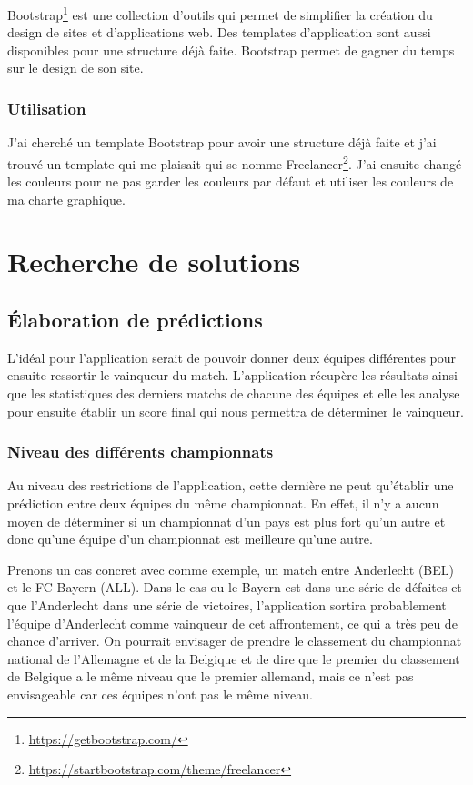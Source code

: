 \documentclass[a4paper,14pt]{extarticle}
\begin{document}
{Bootstrap\footnote{\url{https://getbootstrap.com/}} est une collection d'outils qui permet de simplifier la création du design de sites et d'applications web. Des templates d'application sont aussi disponibles pour une structure déjà faite. Bootstrap permet de gagner du temps sur le design de son site.

\subsubsection{Utilisation}

J'ai cherché un template Bootstrap pour avoir une structure déjà faite et j'ai trouvé un template qui me plaisait qui se nomme Freelancer\footnote{\url{https://startbootstrap.com/theme/freelancer}}. J'ai ensuite changé les couleurs pour ne pas garder les couleurs par défaut et utiliser les couleurs de ma charte graphique. 

\newpage

\section{Recherche de solutions}

\subsection{Élaboration de prédictions}

L'idéal pour l'application serait de pouvoir donner deux équipes différentes pour ensuite ressortir le vainqueur du match. L'application récupère les résultats ainsi que les statistiques des derniers matchs de chacune des équipes et elle les analyse pour ensuite établir un score final qui nous permettra de déterminer le vainqueur.


\subsubsection{Niveau des différents championnats}
\label{niveauDifferentChampionnats}
Au niveau des restrictions de l'application, cette dernière ne peut qu'établir une prédiction entre deux équipes du même championnat. En effet, il n'y a aucun moyen de déterminer si un championnat d'un pays est plus fort qu'un autre et donc qu'une équipe d'un championnat est meilleure qu'une autre. 

Prenons un cas concret avec comme exemple, un match entre Anderlecht (BEL) et le FC Bayern (ALL). Dans le cas ou le Bayern est dans une série de défaites et que l'Anderlecht dans une série de victoires, l'application sortira probablement l'équipe d'Anderlecht comme vainqueur de cet affrontement, ce qui a très peu de chance d'arriver. 
On pourrait envisager de prendre le classement du championnat national de l'Allemagne et de la Belgique et de dire que le premier du classement de Belgique a le même niveau que le premier allemand, mais ce n'est pas envisageable car ces équipes n'ont pas le même niveau.  

}
\end{document}
